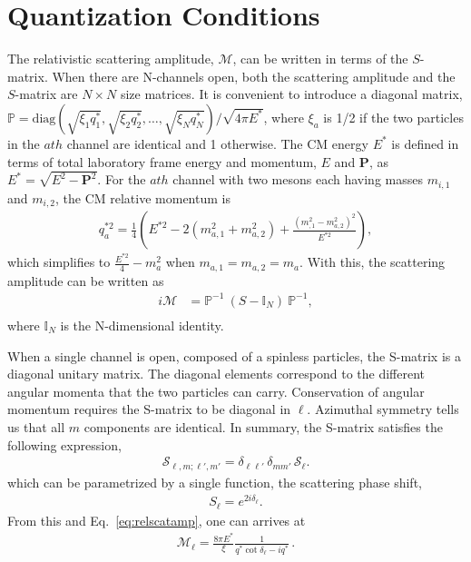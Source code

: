 \section{Quantization Conditions}
The relativistic scattering amplitude, $\mathcal{M}$, can be written in terms of the $S$-matrix. When there are N-channels open, both the scattering amplitude and the $S$-matrix are $N\times N$ size matrices. It is convenient to introduce a diagonal matrix, $\mathbb{P}=\text{diag}(\sqrt{\xi_1 q^{*}_1},\sqrt{\xi_2 q^{*}_2},\ldots,\sqrt{\xi_N q^{*}_N})/\sqrt{4\pi E^*}$, where $\xi_a$ is 1/2 if the two particles in the $a{th}$ channel are identical and 1 otherwise. The CM energy $E^*$ is defined in terms of total laboratory frame energy and momentum, $E$ and $\mathbf{P}$, as $E^*=\sqrt{E^2-\mathbf{P}^2}$. For the $a{th}$ channel with two mesons each having masses $m_{i,1}$ and $m_{i,2}$, the CM relative momentum is
\begin{align}
\label{momentum}
q^{*2}_a=\frac{1}{4}\left(E^{*2}-2(m_{a,1}^2+m_{a,2}^2)+\frac{
(m_{,1}^2-m_{a,2}^2)^2}{E^{*2}}\right),
\end{align}
which simplifies to $\frac{E^{*2}}{4}-m_{a}^2$ when $m_{a,1}=m_{a,2}=m_{a}$. With this, the scattering amplitude can be written as 
\begin{align}
\label{eq:relscatamp}
i\mathcal{M}&=\mathbb{P}^{-1}~(S-\mathbb{I}_N)~\mathbb{P}^{-1},\\
\end{align}
where $\mathbb{I}_N$ is the N-dimensional identity. 
 
When a single channel is open, composed of a spinless particles, the S-matrix is a diagonal unitary matrix. The diagonal elements correspond to the different angular momenta that the two particles can carry.  Conservation of angular momentum requires the S-matrix to be diagonal in $\ell$. Azimuthal symmetry tells us that all $m$ components are identical. In summary, the S-matrix satisfies the following expression,
\begin{eqnarray}
\mathcal{S}_{\ell,m;\ell',m'}
=\delta_{\ell\ell'}\,\delta_{m m'}\,\mathcal S_{\ell}.
\end{eqnarray}
 which can be parametrized by a single function, the scattering phase shift,
 \begin{align}
 S_{\ell}=e^{2i\delta_\ell}.
\end{align}
From this and Eq.~\ref{eq:relscatamp}, one can arrives at 
 \begin{align}
\mathcal M_{\ell}=\frac{8\pi E^*}{\xi}\frac{1}{q^*\cot\delta_{\ell}-iq^*} \,.
\label{eq:scatamp}
 \end{align}
{}
 
